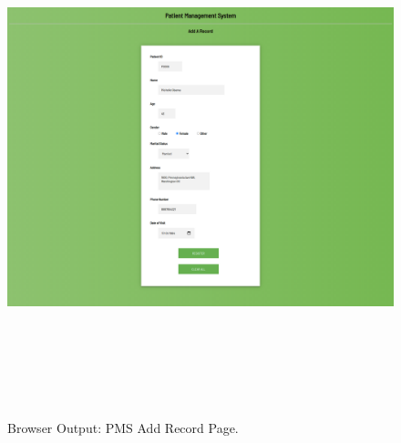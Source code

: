 \documentclass[12pt, a4]{article}
\begin{document}
\newpage
\subsection*{}
\begin{figure}[h]
\centering
\caption{Browser Output: PMS Add Record Page.}
\includegraphics[height=15cm, width=18cm]{Output/PMSAdd.png}
\end{figure}

\newpage
\end{document}
